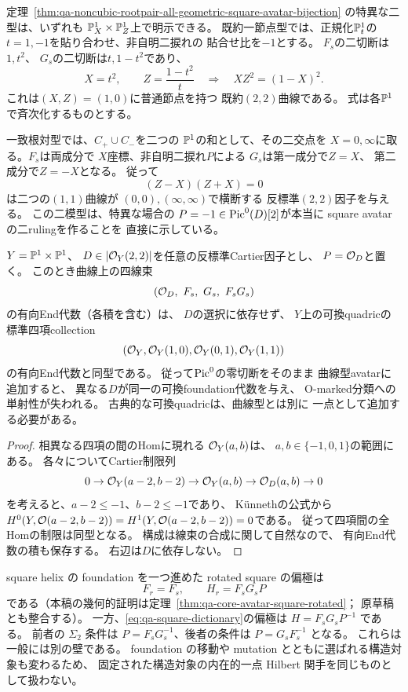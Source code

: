 \begin{remark}[節点型avatarの二つの明示$(2,2)$模型]
\label{rem:qa-singular-square-avatar-explicit-models}
定理~\ref{thm:qa-noncubic-rootpair-all-geometric-square-avatar-bijection}
の特異な二型は、いずれも
$\mathbb P^1_X\times\mathbb P^1_Z$上で明示できる。
既約一節点型では、正規化$\mathbb P^1_t$の
$t=1,-1$を貼り合わせ、非自明二捩れの
貼合せ比を$-1$とする。
$F_s$の二切断は$1,t^2$、
$G_s$の二切断は$t,1-t^2$であり、
\[
 X=t^2,\qquad Z=\frac{1-t^2}{t}
 \quad\Longrightarrow\quad
 XZ^2=(1-X)^2 .
 \tag{Sq-node}\label{eq:qa-nodal-square-avatar-model}
\]
これは$(X,Z)=(1,0)$に普通節点を持つ
既約$(2,2)$曲線である。
式は各$\mathbb P^1$で斉次化するものとする。

一致根対型では、$C_+\cup C_-$を二つの
$\mathbb P^1$の和として、その二交点を
$X=0,\infty$に取る。$F_s$は両成分で
$X$座標、非自明二捩れ$P$による
$G_s$は第一成分で$Z=X$、
第二成分で$Z=-X$となる。
従って
\[
 (Z-X)(Z+X)=0
 \tag{Sq-I2}\label{eq:qa-i2-square-avatar-model}
\]
は二つの$(1,1)$曲線が
$(0,0),(\infty,\infty)$で横断する
反標準$(2,2)$因子を与える。
この二模型は、特異な場合の
$P=-1\in\operatorname{Pic}^0(D)[2]$が本当に
square avatarの二rulingを作ることを
直接に示している。
\end{remark}

\begin{proposition}[Picard零切断の全体を古典pointとして追加できない理由]
\label{prop:qa-avatar-zero-picard-collapse}
$Y=\mathbb P^1\times\mathbb P^1$、
$D\in|\mathcal O_Y(2,2)|$を任意の反標準Cartier因子とし、
$P=\mathcal O_D$と置く。
このとき曲線上の四線束
\[
 (\OO_D,\ F_s,\ G_s,\ F_sG_s)
\]
の有向End代数（各積を含む）は、
$D$の選択に依存せず、
$Y$上の可換quadricの標準四項collection
\[
 (\mathcal O_Y,\mathcal O_Y(1,0),\mathcal O_Y(0,1),\mathcal O_Y(1,1))
\]
の有向End代数と同型である。
従って$\operatorname{Pic}^0$の零切断をそのまま
曲線型avatarに追加すると、
異なる$D$が同一の可換foundation代数を与え、
O-marked分類への単射性が失われる。
古典的な可換quadricは、曲線型とは別に
一点として追加する必要がある。
\end{proposition}
\begin{proof}
相異なる四項の間のHomに現れる
$\mathcal O_Y(a,b)$は、
$a,b\in\{-1,0,1\}$の範囲にある。
各々についてCartier制限列
\[
 0\to\mathcal O_Y(a-2,b-2)\to
 \mathcal O_Y(a,b)\to\mathcal O_D(a,b)\to0
\]
を考えると、$a-2\le-1$、$b-2\le-1$であり、
Künnethの公式から
$H^0(Y,\mathcal O(a-2,b-2))=
H^1(Y,\mathcal O(a-2,b-2))=0$である。
従って四項間の全Homの制限は同型となる。
構成は線束の合成に関して自然なので、
有向End代数の積も保存する。
右辺は$D$に依存しない。
\end{proof}

\begin{remark}
\label{rem:qa-rotated-square}
square helix の foundation を一つ進めた rotated square の偏極は
\[
 F_r=F_s,\qquad H_r=F_sG_sP
\]
である（本稿の幾何的証明は定理~\ref{thm:qa-core-avatar-square-rotated}；
原草稿\cite[命題11.1・定理15.1]{AvatarVSeven2026}とも整合する）。
一方、\eqref{eq:qa-square-dictionary}の偏極は $H=F_sG_sP^{-1}$ である。
前者の $\Sigma _2$ 条件は $P=F_sG_s^{-1}$、後者の条件は $P=G_sF_s^{-1}$ となる。
これらは一般には別の壁である。
foundation の移動や mutation とともに選ばれる構造対象も変わるため、
固定された構造対象の内在的一点 Hilbert 関手を同じものとして扱わない。
\end{remark}

